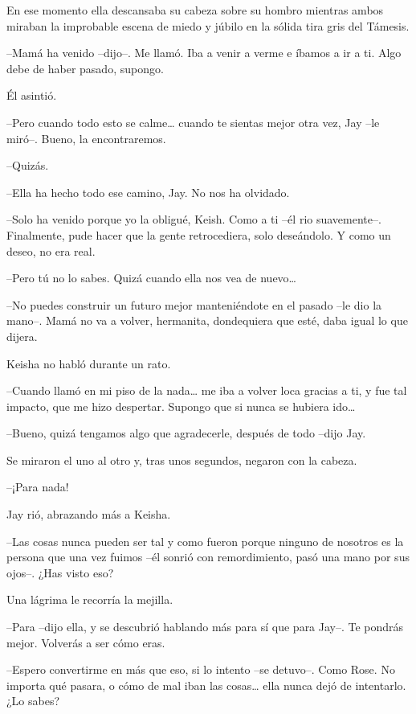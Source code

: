 {En ese momento ella descansaba su cabeza sobre su hombro mientras ambos
 miraban la improbable escena de miedo y júbilo en la sólida tira gris
del Támesis.}

{--Mamá ha venido --dijo--. Me llamó. Iba a venir a verme e íbamos a ir
a ti. Algo debe de haber pasado, supongo.}

{Él asintió.}

{--Pero cuando todo esto se calme\ldots{} cuando te sientas mejor otra
vez, Jay --le miró--. Bueno, la encontraremos.}

{--Quizás.}

{--Ella ha hecho todo ese camino, Jay. No nos ha olvidado.}

{--Solo ha venido porque yo la obligué, Keish. Como a ti --él rio
 suavemente--. Finalmente, pude hacer que la gente retrocediera, solo
deseándolo. Y como un deseo, no era real.}

{--Pero tú no lo sabes. Quizá cuando ella nos vea de nuevo\ldots{}}

{--No puedes construir un futuro mejor manteniéndote en el pasado --le
 dio la mano--. Mamá no va a volver, hermanita, dondequiera que esté,
daba igual lo que dijera.}

{Keisha no habló durante un rato.}

{--Cuando llamó en mi piso de la nada\ldots{} me iba a volver loca
 gracias a ti, y fue tal impacto, que me hizo despertar. Supongo que si
 nunca se hubiera ido\ldots{}}

{--Bueno, quizá tengamos algo que agradecerle, después de todo --dijo
Jay.}

{Se miraron el uno al otro y, tras unos segundos, negaron con la
cabeza.}

{--¡Para nada!}

{Jay rió, abrazando más a Keisha.}

{--Las cosas nunca pueden ser tal y como fueron porque ninguno de
 nosotros es la persona que una vez fuimos --él sonrió con remordimiento,
pasó una mano por sus ojos--. ¿Has visto eso?}

{Una lágrima le recorría la mejilla.}

{--Para --dijo ella, y se descubrió hablando más para sí que para Jay--.
Te pondrás mejor. Volverás a ser cómo eras.}

{--Espero convertirme en más que eso, si lo intento --se detuvo--. Como
 Rose. No importa qué pasara, o cómo de mal iban las cosas\ldots{} ella
nunca dejó de intentarlo. ¿Lo sabes?}

